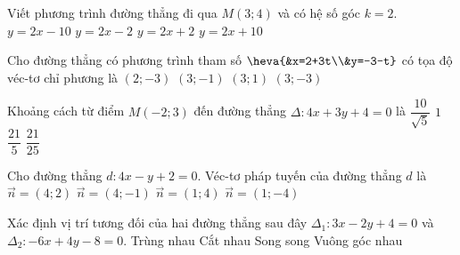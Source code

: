 	\begin{ex}%
		Viết phương trình đường thẳng đi qua $M\left( 3;4 \right)$ và có hệ số góc $k=2$. 
		\choice
		{$y=2x-10$}
		{\True $y=2x-2$}
		{$y=2x+2$}
		{$y=2x+10$}
	\end{ex}
	
	

\begin{ex}%
	Cho đường thẳng có phương trình tham số $\heva{&x=2+3t\\&y=-3-t}$ có tọa độ véc-tơ chỉ phương là
	\choice
	{$\left(2;-3\right)$}
	{\True $\left(3;-1\right)$}
	{$\left(3;1\right)$}
	{$\left(3;-3\right)$}
\end{ex}
\begin{ex}%
	Khoảng cách từ điểm $M(-2;3)$ đến đường thẳng $\Delta \colon 4x+3y+4=0$ là
	\choice
	{$\dfrac{10}{\sqrt{5}}$}
	{\True $1$}
	{$\dfrac{21}{5}$}
	{$\dfrac{21}{25}$}
\end{ex}
\begin{ex}%
	Cho đường thẳng $d \colon 4x-y+2=0$. Véc-tơ pháp tuyến của đường thẳng $d$ là
	\choice
	{$\overrightarrow{n}=(4;2)$}
	{\True $\overrightarrow{n}=(4;-1)$}
	{$\overrightarrow{n}=(1;4)$}
	{$\overrightarrow{n}=(1;-4)$}
\end{ex}
\begin{ex}%
	Xác định vị trí tương đối của hai đường thẳng sau đây $\Delta_1 \colon 3x-2y+4=0$ và \break $\Delta_2 \colon -6x+4y-8=0$.
	\choice
	{\True Trùng nhau}
	{Cắt nhau}
	{Song song}
	{Vuông góc nhau}
\end{ex}
